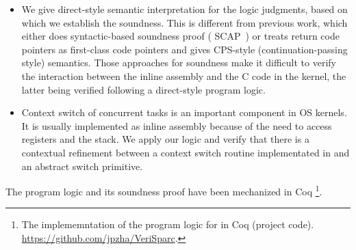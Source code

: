 \begin{itemize}

    \item
    We give direct-style semantic interpretation for
    the logic judgments, based on which we establish the
    soundness. This is different from previous
    work, which either does syntactic-based soundness proof
    (\eg{} SCAP~\cite{Feng06pldi}) or treats return code pointers
    as first-class code pointers and gives CPS-style
    (continuation-passing style) semantics.
    Those approaches for soundness make it difficult to verify
    the interaction between the inline assembly and the C
    code in the kernel, the latter being verified following
    a direct-style program logic.

    \item
	Context switch of concurrent tasks is an important
    component in OS kernels. It is usually implemented
    as inline assembly because of the need to access
    registers and the stack. We apply our logic and
    verify that there is a contextual refinement
    between a context switch routine implementated
    in \sparc{} and an abstract switch primitive. 


\end{itemize}
The program logic and its soundness proof
have been mechanized in Coq
\footnote{The implememntation of the program logic for
\sparc{} in {Coq} (project code).
\url{https://github.com/jpzha/VeriSparc}.}.

